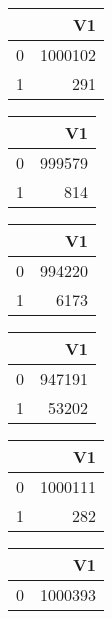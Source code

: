 \bigskip\bigskip
\centering
\begin{tabular}{rr}
  \hline
 & V1 \\ 
  \hline
0 & 1000102 \\ 
  1 & 291 \\ 
   \hline
\end{tabular}

\bigskip\bigskip
\centering
\begin{tabular}{rr}
  \hline
 & V1 \\ 
  \hline
0 & 999579 \\ 
  1 & 814 \\ 
   \hline
\end{tabular}

\bigskip\bigskip
\centering
\begin{tabular}{rr}
  \hline
 & V1 \\ 
  \hline
0 & 994220 \\ 
  1 & 6173 \\ 
   \hline
\end{tabular}

\bigskip\bigskip
\centering
\begin{tabular}{rr}
  \hline
 & V1 \\ 
  \hline
0 & 947191 \\ 
  1 & 53202 \\ 
   \hline
\end{tabular}

\bigskip\bigskip
\centering
\begin{tabular}{rr}
  \hline
 & V1 \\ 
  \hline
0 & 1000111 \\ 
  1 & 282 \\ 
   \hline
\end{tabular}

\bigskip\bigskip
\centering
\begin{tabular}{rr}
  \hline
 & V1 \\ 
  \hline
0 & 1000393 \\ 
   \hline
\end{tabular}

